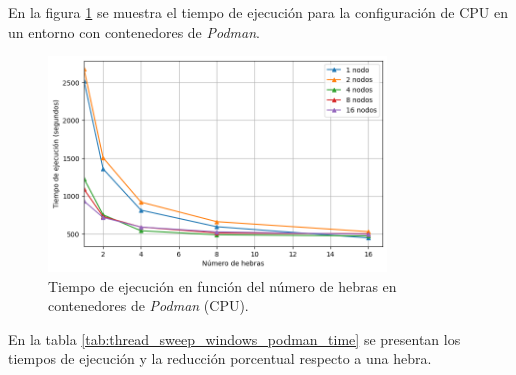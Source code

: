 En la figura \ref{fig:thread_sweep_windows_podman_time} se muestra el tiempo de ejecución para la configuración de CPU en un entorno con contenedores de \textit{Podman}.

\begin{figure}[H]
    \centering
    \includegraphics[width=0.8\textwidth]{imagenes/cap5/thread_sweep_windows_podman_time.png}
    \caption{Tiempo de ejecución en función del número de hebras en contenedores de \textit{Podman} (CPU).}
    \label{fig:thread_sweep_windows_podman_time}
\end{figure}

En la tabla \ref{tab:thread_sweep_windows_podman_time} se presentan los tiempos de ejecución y la reducción porcentual respecto a una hebra.

